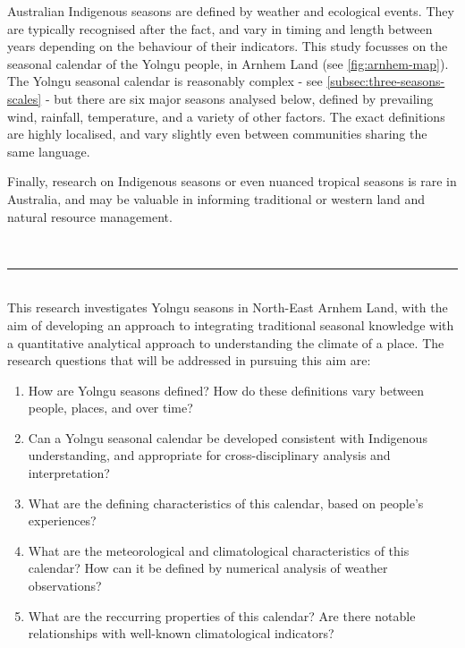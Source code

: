 Australian Indigenous seasons are defined by weather and ecological events.
They are typically recognised after the fact, and vary in timing and length
between years depending on the behaviour of their indicators.  This study
focusses on the seasonal calendar of the Yolngu people, in Arnhem Land (see
\cref{fig:arnhem-map}).
%
The Yolngu seasonal calendar is reasonably complex - see
\cref{subsec:three-seasons-scales} - but there are six major seasons
analysed below, defined by prevailing wind, rainfall, temperature, and a
variety of other factors.  The exact definitions are highly localised,
and vary slightly even between communities sharing the same language.










Finally, research on Indigenous seasons or even nuanced tropical seasons
is rare in Australia, and may be valuable in informing traditional or
western land and natural resource management.








~\\ \hrule ~\\

This research investigates Yolngu seasons in North-East Arnhem Land, with the
aim of developing an approach to integrating traditional seasonal knowledge
with a quantitative analytical approach to understanding the climate of a
place.
%
The research questions that will be addressed in pursuing this aim are:
\begin{enumerate}
\item How are Yolngu seasons defined?  How do these definitions vary between
    people, places, and over time?
\item Can a Yolngu seasonal calendar be developed consistent with Indigenous
    understanding, and appropriate for cross-disciplinary analysis and interpretation?
\item What are the defining characteristics of this calendar, based on
    people's experiences?
\item What are the meteorological and climatological characteristics of this
    calendar?  How can it be defined by numerical analysis of weather observations?
\item What are the reccurring properties of this calendar?  Are there notable
    relationships with well-known climatological indicators?
\end{enumerate}

